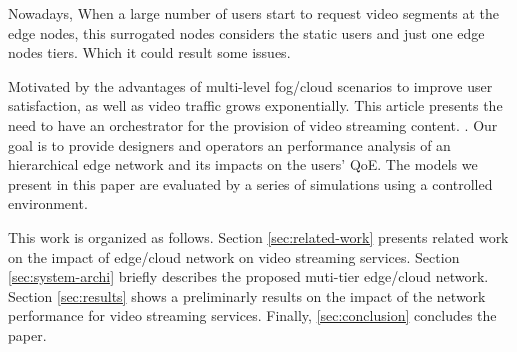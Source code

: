 Nowadays, When a large number of users start to request video segments at the edge nodes, this surrogated nodes considers the static users and just one edge nodes tiers. Which it could result some issues. 

Motivated by the advantages of multi-level fog/cloud scenarios to improve user satisfaction, as well as video traffic grows exponentially. This article presents the need to have an orchestrator for the provision of video streaming content.
. Our goal is to provide designers and operators an performance analysis  of an hierarchical edge network and its impacts on the users' QoE. The models we present in this paper are evaluated by a series of simulations using a controlled environment.

This work is organized as follows.
Section \ref{sec:related-work} presents related work on the impact of edge/cloud network on video streaming services.
Section \ref{sec:system-archi} briefly describes the proposed muti-tier edge/cloud network.
Section \ref{sec:results} shows a preliminarly results on the impact of the network performance for video streaming services.
Finally, \ref{sec:conclusion} concludes the paper.